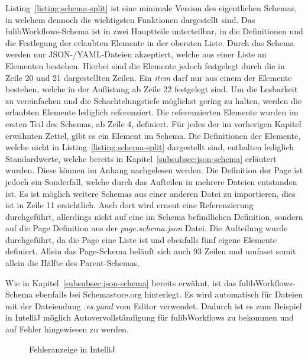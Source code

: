 Listing~\ref{listing:schema-split} ist eine minimale Version des eigentlichen Schemas, in welchem dennoch die wichtigsten Funktionen dargestellt sind.
Das fulibWorkflows-Schema ist in zwei Hauptteile unterteilbar, in die Definitionen und die Festlegung der erlaubten Elemente in der obersten Liste.
Durch das Schema werden nur JSON-/YAML-Dateien akzeptiert, welche aus einer Liste an Elementen bestehen.
Hierbei sind die Elemente jedoch festgelegt durch die in Zeile 20 und 21 dargestellten Zeilen.
Ein \textit{item} darf nur aus einem der Elemente bestehen, welche in der Auflistung ab Zeile 22 festgelegt sind.
Um die Lesbarkeit zu vereinfachen und die Schachtelungstiefe möglichst gering zu halten, werden die erlaubten Elemente lediglich referenziert.
Die referenzierten Elemente wurden im ersten Teil des Schemas, ab Zeile 4, definiert.
Für jedes der im vorherigen Kapitel erwähnten Zettel, gibt es ein Element im Schema.
Die Definitionen der Elemente, welche nicht in Listing~\ref{listing:schema-split} dargestellt sind, enthalten lediglich Standardwerte, welche bereits in Kapitel~\ref{subsubsec:json-schema} erläutert wurden.
Diese können im Anhang nachgelesen werden.
Die Definition der Page ist jedoch ein Sonderfall, welche durch das Aufteilen in mehrere Dateien entstanden ist.
Es ist möglich weitere Schemas aus einer anderen Datei zu importieren, dies ist in Zeile 11 ersichtlich.
Auch dort wird erneut eine Referenzierung durchgeführt, allerdings nicht auf eine im Schema befindlichen Definition, sondern auf die Page Definition aus der \textit{page.schema.json} Datei.
Die Aufteilung wurde durchgeführt, da die Page eine Liste ist und ebenfalls fünf eigene Elemente definiert.
Allein das Page-Schema beläuft sich auch 93 Zeilen und umfasst somit allein die Hälfte des Parent-Schemas.

Wie in Kapitel~\ref{subsubsec:json-schema} bereits erwähnt, ist das fulibWorkflows-Schema ebenfalls bei Schemastore.org hinterlegt.
Es wird automatisch für Dateien mit der Dateiendung \textit{.es.yaml} vom Editor verwendet.
Dadurch ist es zum Beispiel in IntelliJ möglich Autovervollständigung für fulibWorkflows zu bekommen und auf Fehler hingewiesen zu werden.

\begin{figure}%
    \centering
    \qquad
    \caption{Fehleranzeige in IntelliJ}%
    \label{fig:errors-schema}%
\end{figure}

